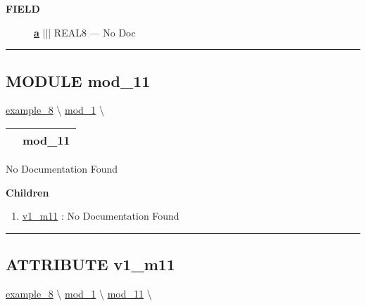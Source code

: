 \par
\begin{description}
\item [\colorbox{tagtype}{\color{white} \textbf{\textsf{FIELD}}}] \textbf{\underline{a}} ||| REAL8 --- No Doc
\end{description}





\rule{\linewidth}{0.5pt}
\subsection*{\textsf{\colorbox{headtoc}{\color{white} MODULE}
mod\_11}}

\hypertarget{ecldoc:example_8.mod_1.mod_11}{}
\hspace{0pt} \hyperlink{ecldoc:example_8}{example_8} \textbackslash 
\hspace{0pt} \hyperlink{ecldoc:example_8.mod_1}{mod_1} \textbackslash 

{\renewcommand{\arraystretch}{1.5}
\begin{tabularx}{\textwidth}{|>{\raggedright\arraybackslash}l|X|}
\hline
\hspace{0pt}\mytexttt{\color{red} } & \textbf{mod\_11} \\
\hline
\end{tabularx}
}

\par





No Documentation Found







\textbf{Children}
\begin{enumerate}
\item \hyperlink{ecldoc:example_8.mod_1.mod_11.v1_m11}{v1\_m11}
: No Documentation Found
\end{enumerate}

\rule{\linewidth}{0.5pt}

\subsection*{\textsf{\colorbox{headtoc}{\color{white} ATTRIBUTE}
v1\_m11}}

\hypertarget{ecldoc:example_8.mod_1.mod_11.v1_m11}{}
\hspace{0pt} \hyperlink{ecldoc:example_8}{example_8} \textbackslash 
\hspace{0pt} \hyperlink{ecldoc:example_8.mod_1}{mod_1} \textbackslash 
\hspace{0pt} \hyperlink{ecldoc:example_8.mod_1.mod_11}{mod_11} \textbackslash 

